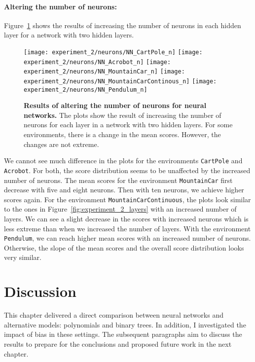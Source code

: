 \paragraph{Altering the number of neurons:} Figure~\ref{fig:experiment_2_neurons} shows the results of increasing the number of neurons in each hidden layer for a network with two hidden layers.
\begin{figure}[!ht]
  \centering
  \texttt{[image: experiment\_2/neurons/NN\_CartPole\_n]}
  \texttt{[image: experiment\_2/neurons/NN\_Acrobot\_n]}
  \texttt{[image: experiment\_2/neurons/NN\_MountainCar\_n]}
  \texttt{[image: experiment\_2/neurons/NN\_MountainCarContinous\_n]}
  \texttt{[image: experiment\_2/neurons/NN\_Pendulum\_n]}
\caption[Results of altering the number of neurons for neural networks]{
  \textbf{Results of altering the number of neurons for neural networks.}
  The plots show the result of increasing the number of neurons for each layer in a network with two hidden layers. For some environments, there is a change in the mean scores. However, the changes are not extreme.
}
\label{fig:experiment_2_neurons}
\end{figure}
We cannot see much difference in the plots for the environments \verb|CartPole| and \verb|Acrobot|. For both, the score distribution seems to be unaffected by the increased number of neurons. The mean scores for the environment \verb|MountainCar| first decrease with five and eight neurons. Then with ten neurons, we achieve higher scores again. For the environment \verb|MountainCarContinuous|, the plots look similar to the ones in Figure~\ref{fig:experiment_2_layers} with an increased number of layers. We can see a slight decrease in the scores with increased neurons which is less extreme than when we increased the number of layers. With the environment \verb|Pendulum|, we can reach higher mean scores with an increased number of neurons. Otherwise, the slope of the mean scores and the overall score distribution looks very similar.

\clearpage
\section{Discussion}
This chapter delivered a direct comparison between neural networks and alternative models: polynomials and binary trees. In addition, I investigated the impact of bias in these settings. The subsequent paragraphs aim to discuss the results to prepare for the conclusions and proposed future work in the next chapter.

